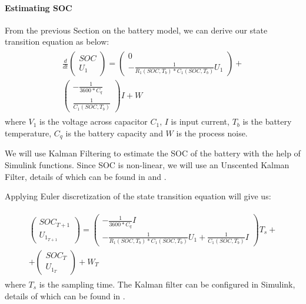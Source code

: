 \paragraph{Estimating SOC} From the previous Section  on the battery model, we can derive our state transition equation as below:
\begin{equation}
  \label{state transition_1}
\begin{aligned}
\begin{split}
  \frac{d}{dt}  \left( \begin{array}{c} SOC \\ U_1 \end{array}\right) = \left( \begin{array}{c} 0 \\ - \frac{1}{R_1(SOC, T_b)*C_1(SOC, T_b)}U_1 \end{array}\right) + \\ \left( \begin{array}{c} -\frac{1}{3600*C_q} \\  \frac{1}{C_1(SOC, T_b)} \end{array}\right)I + W
 \end{split}
 \end{aligned}
\end{equation}
where  $V_1$ is the voltage across capacitor $C_1$, $I$ is input current, $T_b$ is the battery temperature, $C_q$ is the battery capacity and $W$ is the process noise.

We will use Kalman Filtering to estimate the SOC of the battery with the help of Simulink functions. Since SOC is non-linear, we will use an Unscented Kalman Filter, details of which can be found in \cite{6183271} and \cite{882463}.

Applying Euler discretization of the state transition equation will give us:

\begin{equation}
  \label{state transition_2}
\begin{aligned}
\begin{split}
 \left( \begin{array}{c} SOC_{T+1} \\ U_{1_{T+1}}\end{array}\right) = 
 \left( \begin{array}{c} -\frac{1}{3600*C_q}I \\-\frac{1}{R_1(SOC, T_b)*C_1(SOC, T_b)}U_1 + \frac{1}{C_1(SOC, T_b)}I\end{array}\right)T_s + \\
 + \left( \begin{array}{c} SOC_{T} \\ U_{1_{T}}\end{array}\right) + W_T
 \end{split}
 \end{aligned}
\end{equation}
where $T_s$ is the sampling time.
The Kalman filter can be configured in Simulink, details of which can be found in \cite{6183271}.

